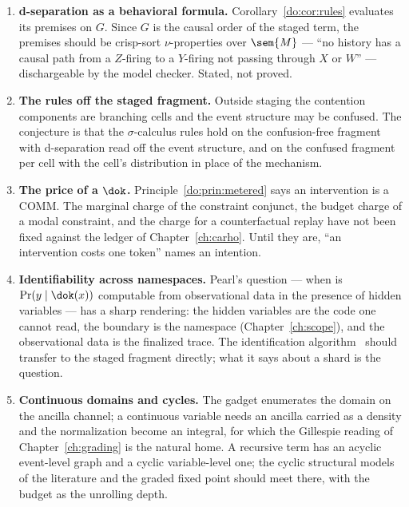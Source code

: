 \begin{enumerate}[leftmargin=1.6em,itemsep=3pt]
\item \textbf{d-separation as a behavioral formula.} Corollary~\ref{do:cor:rules} evaluates its
premises on $G$. Since $G$ is the causal order of the staged term, the premises should be
crisp-sort $\nu$-properties over $\sem{M}$ --- ``no history has a causal path from a $Z$-firing to
a $Y$-firing not passing through $X$ or $W$'' --- dischargeable by the model checker. Stated, not
proved.
\item \textbf{The rules off the staged fragment.} Outside staging the contention components are
branching cells and the event structure may be confused. The conjecture is that the
$\sigma$-calculus rules hold on the confusion-free fragment with d-separation read off the event
structure, and on the confused fragment per cell with the cell's distribution in place of the
mechanism.
\item \textbf{The price of a $\dok$.} Principle~\ref{do:prin:metered} says an intervention is a
COMM. The marginal charge of the constraint conjunct, the budget charge of a modal constraint, and
the charge for a counterfactual replay have not been fixed against the ledger of
Chapter~\ref{ch:carho}. Until they are, ``an intervention costs one token'' names an intention.
\item \textbf{Identifiability across namespaces.} Pearl's question --- when is $\Pr(y \mid \dok(x))$
computable from observational data in the presence of hidden variables --- has a sharp rendering:
the hidden variables are the code one cannot read, the boundary is the namespace
(Chapter~\ref{ch:scope}), and the observational data is the finalized trace. The identification
algorithm~\cite{ShpitserPearl} should transfer to the staged fragment directly; what it says
about a shard is the question.
\item \textbf{Continuous domains and cycles.} The gadget enumerates the domain on the ancilla
channel; a continuous variable needs an ancilla carried as a density and the normalization become
an integral, for which the Gillespie reading of Chapter~\ref{ch:grading} is the natural home. A
recursive term has an acyclic event-level graph and a cyclic variable-level one; the cyclic
structural models of the literature and the graded fixed point should meet there, with the budget
as the unrolling depth.
\end{enumerate}

